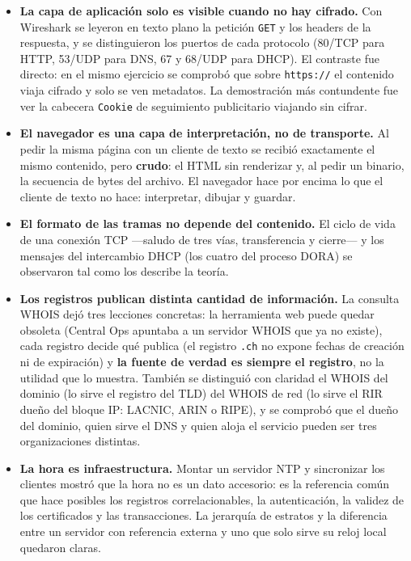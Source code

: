 \documentclass[11pt,a4paper]{report}
\begin{document}
\begin{itemize}
  \item \textbf{La capa de aplicación solo es visible cuando no hay cifrado.} Con
        Wireshark se leyeron en texto plano la petición \texttt{GET} y los headers
        de la respuesta, y se distinguieron los puertos de cada protocolo (80/TCP
        para HTTP, 53/UDP para DNS, 67 y 68/UDP para DHCP). El contraste fue
        directo: en el mismo ejercicio se comprobó que sobre \texttt{https://} el
        contenido viaja cifrado y solo se ven metadatos. La demostración más
        contundente fue ver la cabecera \texttt{Cookie} de seguimiento publicitario
        viajando sin cifrar.

  \item \textbf{El navegador es una capa de interpretación, no de transporte.} Al
        pedir la misma página con un cliente de texto se recibió exactamente el
        mismo contenido, pero \textbf{crudo}: el HTML sin renderizar y, al pedir un
        binario, la secuencia de bytes del archivo. El navegador hace por encima lo
        que el cliente de texto no hace: interpretar, dibujar y guardar.

  \item \textbf{El formato de las tramas no depende del contenido.} El ciclo de vida
        de una conexión TCP ---saludo de tres vías, transferencia y cierre--- y los
        mensajes del intercambio DHCP (los cuatro del proceso DORA) se observaron
        tal como los describe la teoría.

  \item \textbf{Los registros publican distinta cantidad de información.} La
        consulta WHOIS dejó tres lecciones concretas: la herramienta web puede
        quedar obsoleta (Central Ops apuntaba a un servidor WHOIS que ya no
        existe), cada registro decide qué publica (el registro \texttt{.ch} no
        expone fechas de creación ni de expiración) y \textbf{la fuente de verdad
        es siempre el registro}, no la utilidad que lo muestra. También se
        distinguió con claridad el WHOIS del dominio (lo sirve el registro del TLD)
        del WHOIS de red (lo sirve el RIR dueño del bloque IP: LACNIC, ARIN o
        RIPE), y se comprobó que el dueño del dominio, quien sirve el DNS y quien
        aloja el servicio pueden ser tres organizaciones distintas.

  \item \textbf{La hora es infraestructura.} Montar un servidor NTP y sincronizar
        los clientes mostró que la hora no es un dato accesorio: es la referencia
        común que hace posibles los registros correlacionables, la autenticación,
        la validez de los certificados y las transacciones. La jerarquía de
        estratos y la diferencia entre un servidor con referencia externa y uno
        que solo sirve su reloj local quedaron claras.


\end{itemize}
\end{document}

